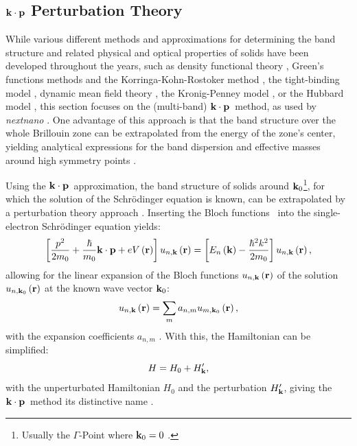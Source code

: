 \subsection{\boldmath\texorpdfstring{$\vb{k}\cdot\vb{p}$}{k·p} Perturbation Theory} \label{ssec:k-p-method}
While various different methods and approximations for determining the band structure and related physical and optical properties of solids have been developed throughout the years, such as density functional theory \cite{Hellmann1935,Hohenberg1964,Kohn1965,Topp1973,Langreth1983,Becke1988,Perdew1992}, Green's functions methods and the Korringa-Kohn-Rostoker method \cite{Korringa1947,Kohn1954,Dupree1961,Morgan1966,Beeby1967,Madelung1967,Zeller1995,Wildberger1997,Papanikolaou2002,Buth2005,Jiang2011}, the tight-binding model \cite{Slater1954,Kwon1994,Lenosky1997,Schulz2005}, dynamic mean field theory \cite{Georges1992,Georges1996,Kotliar2004,Vollhardt2010}, the Kronig-Penney model \cite{Kronig1931,Singh1983,Cho1987,Yuh1988}, or the Hubbard model \cite{Hubbard1963-I,Hubbard1964-II,Hubbard1964-III}, this section focuses on the (multi-band) $\vb{k}\cdot\vb{p}$~method, as used by \emph{nextnano} \cite{Birner2006,Trellakis2006,Birner2007}. One advantage of this approach is that the band structure over the whole Brillouin zone can be extrapolated from the energy of the zone's center, yielding analytical expressions for the band dispersion and effective masses around high symmetry points \cite{Kittel1987,Piprek2003,Yu2010}.

Using the $\vb{k}\cdot\vb{p}$~approximation, the band structure of solids around $\vb{k}_0$\footnote{Usually the $\Gamma$-Point where $\vb{k}_0 = 0$ \cite{Kittel1987,Piprek2003,Yu2010}.}, for which the solution of the Schrödinger equation is known, can be extrapolated by a perturbation theory approach \cite{Kittel1987,Piprek2003,Yu2010}. Inserting the Bloch functions~ into the single-electron Schrödinger equation yields:
\begin{equation}
  \left[ \frac{p^2}{2m_0} + \frac{\hbar}{m_0}\vb{k}\cdot\vb{p} + eV\left(\vb{r}\right)\right]u_{n,\vb{k}}\left(\vb{r}\right) = \left[E_n\left(\vb{k}\right) - \frac{\hbar^2k^2}{2m_0}\right]u_{n,\vb{k}}\left(\vb{r}\right),
\end{equation}
allowing for the linear expansion of the Bloch functions $u_{n,\vb{k}}\left(\vb{r}\right)$ of the solution $u_{n,\vb{k}_0}\left(\vb{r}\right)$ at the known wave vector $\vb{k}_0$:
\begin{equation}
  u_{n,\vb{k}}\left(\vb{r}\right) = \sum_m a_{n,m} u_{m,\vb{k}_0}\left(\vb{r}\right),
\end{equation}
with the expansion coefficients $a_{n,m}$ \cite{Kittel1987,Piprek2003,Yu2010}. With this, the Hamiltonian can be simplified:
\begin{equation}
  H = H_0 + H_{\vb{k}}',
\end{equation}
with the unperturbated Hamiltonian $H_0$ and the perturbation $H_{\vb{k}}'$, giving the $\vb{k}\cdot\vb{p}$~method its distinctive name \cite{Kittel1987,Piprek2003,Yu2010}.

